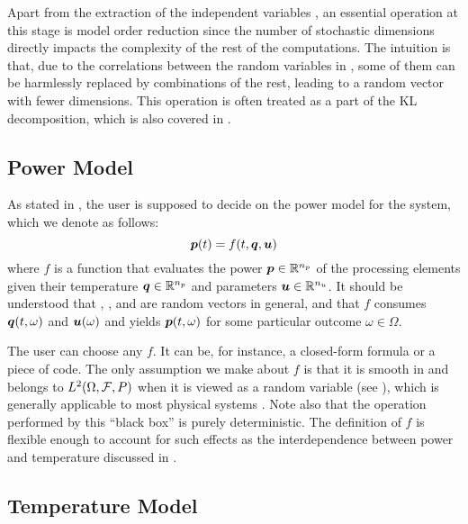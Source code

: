 Apart from the extraction of the independent variables \vz, an essential
operation at this stage is model order reduction since the number of stochastic
dimensions directly impacts the complexity of the rest of the computations. The
intuition is that, due to the correlations between the random variables in \vu,
some of them can be harmlessly replaced by combinations of the rest, leading to
a random vector \vz with fewer dimensions. This operation is often treated as a
part of the \ac{KL} decomposition, which is also covered in
.

\subsection{Power Model}

As stated in , the user is supposed to decide on the power
model for the system, which we denote as follows:
\begin{equation} \elab{chaos-power-model}
  \vp(t) = f(t, \vq, \vu)
\end{equation}
where $f$ is a function that evaluates the power $\boldsymbol{p} \in \mathbb{R}^{n_{p}}$ of the
processing elements given their temperature $\boldsymbol{q} \in \mathbb{R}^{n_{p}}$ and parameters
$\boldsymbol{u} \in \mathbb{R}^{n_{u}}$. It should be understood that \vp, \vq, and \vu are random
vectors in general, and that $f$ consumes $\boldsymbol{q}(t, \omega)$ and $\boldsymbol{u}(\omega)$ and
yields $\boldsymbol{p}(t, \omega)$ for some particular outcome $\omega \in \Omega$.

The user can choose any $f$. It can be, for instance, a closed-form formula or a
piece of code. The only assumption we make about $f$ is that it is smooth in \vz
and belongs to $\L{2}(\Omega, \mathcal{F}, \probability)$ when it is viewed as a
random variable (see ), which is generally applicable
to most physical systems \cite{xiu2010}. Note also that the operation performed
by this ``black box'' is purely deterministic. The definition of $f$ is flexible
enough to account for such effects as the interdependence between power and
temperature discussed in .

\subsection{Temperature Model}

